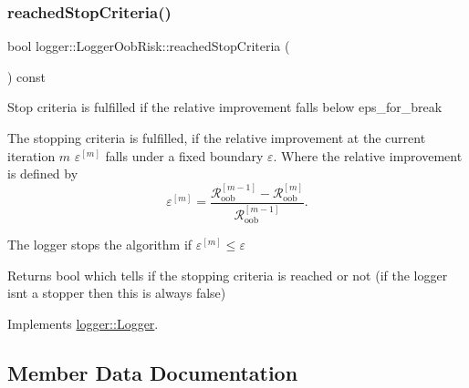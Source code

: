 \mbox{\label{classlogger_1_1_logger_oob_risk_a15c6792b0e1d2acbdd907f697f2884f3}} 
\subsubsection{\texorpdfstring{reached\+Stop\+Criteria()}{reachedStopCriteria()}}
{\footnotesize\ttfamily bool logger\+::\+Logger\+Oob\+Risk\+::reached\+Stop\+Criteria (\begin{DoxyParamCaption}{ }\end{DoxyParamCaption}) const\hspace{0.3cm}{\ttfamily [virtual]}}



Stop criteria is fulfilled if the relative improvement falls below {\ttfamily eps\+\_\+for\+\_\+break} 

The stopping criteria is fulfilled, if the relative improvement at the current iteration $m$ $\varepsilon^{[m]}$ falls under a fixed boundary $\varepsilon$. Where the relative improvement is defined by \[ \varepsilon^{[m]} = \frac{\mathcal{R}_\mathrm{oob}^{[m-1]} - \mathcal{R}_\mathrm{oob}^{[m]}}{\mathcal{R}_\mathrm{oob}^{[m-1]}}. \]

The logger stops the algorithm if $\varepsilon^{[m]} \leq \varepsilon$

\begin{DoxyReturn}{Returns}
{\ttfamily bool} which tells if the stopping criteria is reached or not (if the logger isn\textquotesingle{}t a stopper then this is always false) 
\end{DoxyReturn}


Implements \hyperlink{classlogger_1_1_logger_aed91421c07062b91cee158ef2bda7ae8}{logger\+::\+Logger}.



\subsection{Member Data Documentation}
\mbox{\label{classlogger_1_1_logger_oob_risk_ac4c642d6e83bfa16cc5c6026a1238f58}} 
